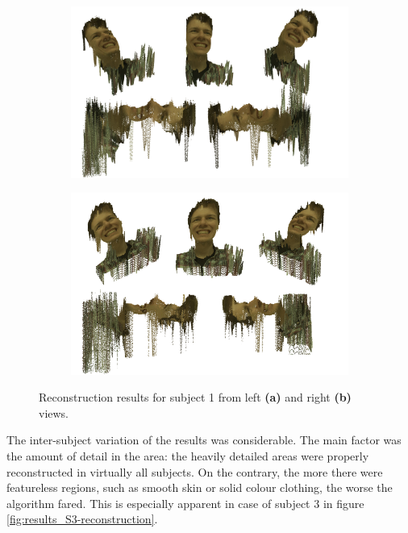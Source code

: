 \documentclass[journal]{IEEEtran}
\begin{document}
\begin{figure}
    \centering
    \begin{subfigure}[t]{\linewidth}
        \centering
        \includegraphics[width=\linewidth]{result_S1_R}
		\caption{}
		\label{fig:result_S1_R}
    \end{subfigure}
    
    \begin{subfigure}[t]{\linewidth}
        \centering
		\includegraphics[width=\linewidth]{result_S1_L}
		\caption{}
		\label{fig:result_S1_L}
    \end{subfigure}
    
    \caption{Reconstruction results for subject 1 from left \textbf{(a)} and right \textbf{(b)} views.}
    \label{fig:results-reconstruction}

\end{figure}

The inter-subject variation of the results was considerable. The main factor was the amount of detail in the area: the heavily detailed areas were properly reconstructed in virtually all subjects. 
On the contrary, the more there were featureless regions, such as smooth skin or solid colour clothing, the worse the algorithm fared. 
This is especially apparent in case of subject 3 in figure \ref{fig:results_S3-reconstruction}.
\end{document}
